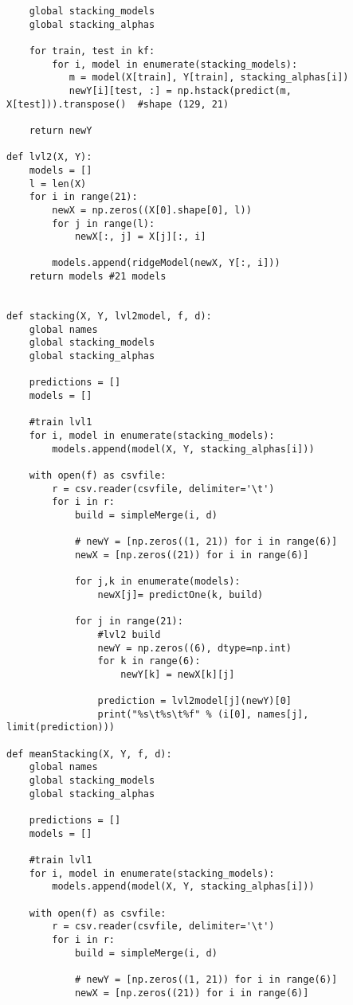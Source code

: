 \documentclass[a4paper,11pt]{article}
\begin{document}
\begin{lstlisting}
    global stacking_models
    global stacking_alphas

    for train, test in kf:
        for i, model in enumerate(stacking_models):
           m = model(X[train], Y[train], stacking_alphas[i])
           newY[i][test, :] = np.hstack(predict(m, X[test])).transpose()  #shape (129, 21)

    return newY

def lvl2(X, Y):
    models = []
    l = len(X)
    for i in range(21):
        newX = np.zeros((X[0].shape[0], l))
        for j in range(l):
            newX[:, j] = X[j][:, i]

        models.append(ridgeModel(newX, Y[:, i]))
    return models #21 models


def stacking(X, Y, lvl2model, f, d):
    global names
    global stacking_models
    global stacking_alphas

    predictions = []
    models = []

    #train lvl1
    for i, model in enumerate(stacking_models):
        models.append(model(X, Y, stacking_alphas[i]))

    with open(f) as csvfile:
        r = csv.reader(csvfile, delimiter='\t')
        for i in r:
            build = simpleMerge(i, d)

            # newY = [np.zeros((1, 21)) for i in range(6)]
            newX = [np.zeros((21)) for i in range(6)]

            for j,k in enumerate(models):
                newX[j]= predictOne(k, build)

            for j in range(21):
                #lvl2 build
                newY = np.zeros((6), dtype=np.int)
                for k in range(6):
                    newY[k] = newX[k][j]

                prediction = lvl2model[j](newY)[0]
                print("%s\t%s\t%f" % (i[0], names[j], limit(prediction)))

def meanStacking(X, Y, f, d):
    global names
    global stacking_models
    global stacking_alphas

    predictions = []
    models = []

    #train lvl1
    for i, model in enumerate(stacking_models):
        models.append(model(X, Y, stacking_alphas[i]))

    with open(f) as csvfile:
        r = csv.reader(csvfile, delimiter='\t')
        for i in r:
            build = simpleMerge(i, d)

            # newY = [np.zeros((1, 21)) for i in range(6)]
            newX = [np.zeros((21)) for i in range(6)]


\end{lstlisting}
\end{document}
